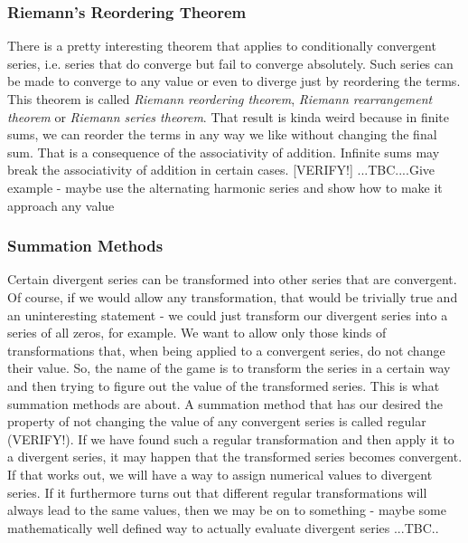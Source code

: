 \subsubsection{Riemann's Reordering Theorem} There is a pretty interesting theorem that applies to conditionally convergent series, i.e. series that do converge but fail to converge absolutely. Such series can be made to converge to any value or even to diverge just by reordering the terms. This theorem is called \emph{Riemann reordering theorem}, \emph{Riemann rearrangement theorem} or \emph{Riemann series theorem}. That result is kinda weird because in finite sums, we can reorder the terms in any way we like without changing the final sum. That is a consequence of the associativity of addition. Infinite sums may break the associativity of addition in certain cases. [VERIFY!] ...TBC....Give example - maybe use the alternating harmonic series and show how to make it approach any value




\subsubsection{Summation Methods} Certain divergent series can be transformed into other series that are convergent. Of course, if we would allow any transformation, that would be trivially true and an uninteresting statement - we could just transform our divergent series into a series of all zeros, for example. We want to allow only those kinds of transformations that, when being applied to a convergent series, do not change their value. So, the name of the game is to transform the series in a certain way and then trying to figure out the value of the transformed series. This is what summation methods are about. A summation method that has our desired the property of not changing the value of any convergent series is called regular (VERIFY!). If we have found such a regular transformation and then apply it to a divergent series, it may happen that the transformed series becomes convergent. If that works out, we will have a way to assign numerical values to divergent series. If it furthermore turns out that different regular transformations will always lead to the same values, then we may be on to something - maybe some mathematically well defined way to actually evaluate divergent series ...TBC..

